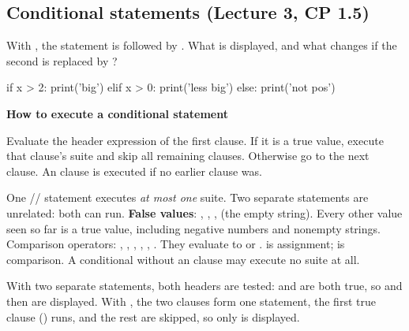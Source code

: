 \documentclass[10pt]{scrartcl}
\newenvironment{howto}[1]{\begin{mdframed}[style=howtostyle]{\color{NavyBlue}\textbf{#1}}\par\vspace{2pt}}{\end{mdframed}}
\begin{document}
\subsection{Conditional statements (Lecture 3, CP 1.5)}
\begin{qbox}
  With , the statement  is followed by . What is displayed, and what changes if the second  is replaced by ?
\end{qbox}
\begin{py}
if x > 2:
    print('big')
elif x > 0:
    print('less big')
else:
    print('not pos')
\end{py}
\begin{howto}{How to execute a conditional statement}
\begin{steps}
  \ii Evaluate the header expression of the first clause.
  \ii If it is a true value, execute that clause's suite and skip all remaining clauses.
  \ii Otherwise go to the next clause. An  clause is executed if no earlier clause was.
\end{steps}
\end{howto}
\begin{itemize}
  \ii One // statement executes \emph{at most one} suite. Two separate  statements are unrelated: both can run.
  \ii \textbf{False values}: , , ,  (the empty string). Every other value seen so far is a true value, including negative numbers and nonempty strings.
  \ii Comparison operators: \cd{>}, \cd{<}, \cd{>=}, \cd{<=}, \cd{==}, \cd{!=}. They evaluate to  or . \cd{=} is assignment; \cd{==} is comparison.
  \ii A conditional without an  clause may execute no suite at all.
\end{itemize}
\revisit With two separate  statements, both headers are tested:  and  are both true, so  and then  are displayed. With , the two clauses form one statement, the first true clause () runs, and the rest are skipped, so only  is displayed.
\end{document}
